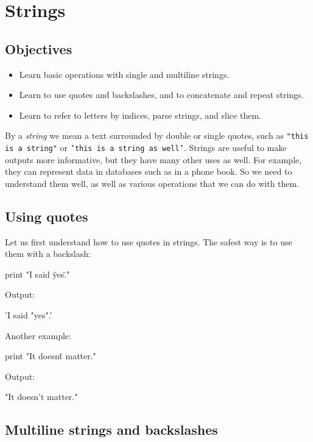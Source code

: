 
\section{Strings} \label{sec:strings}

\subsection{Objectives}

\begin{itemize}
\item Learn basic operations with single and multiline strings.
\item Learn to use quotes and backslashes, and to concatenate and repeat strings.
\item Learn to refer to letters by indices, parse strings, and slice them.
\end{itemize}
By a {\em string} we mean a text surrounded by double or single quotes, such as 
{\tt "this is a string"} or {\tt 'this is a string as well'}.
Strings are useful to make outputs more informative, but 
they have many other uses as well. For example, they can represent data 
in databases such as in a phone book. So we need to understand them well,
as well as various operations that we can do with them.

\subsection{Using quotes}

Let us first understand how to use quotes in strings. The safest way is to use 
them with a backslash:

\begin{bluecode}
print "I said \"yes\"."
\end{bluecode}
Output:

\begin{bluecode}
'I said "yes".'
\end{bluecode}
Another example:

\begin{bluecode}
print "It doesn\'t matter."
\end{bluecode}
Output:

\begin{bluecode}
"It doesn't matter."
\end{bluecode}

\subsection{Multiline strings and backslashes}

